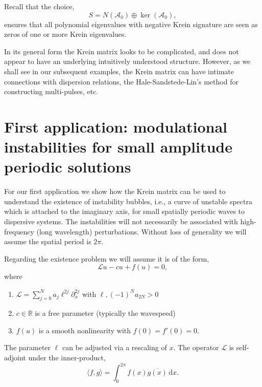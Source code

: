 \documentclass[review,onefignum,onetabnum]{siamart171218}
\newcommand{\R}{\mathbb{R}}
\def\ker{\mathop\mathrm{ker}\nolimits}
\newcommand{\rmd}{\mathrm{d}}
\newcommand{\calA}{\mathcal{A}}
\newcommand{\calL}{\mathcal{L}}
\begin{document}
\begin{remark}
Recall that the choice,
\[
S=N(\calA_0)\oplus\ker(\calA_0),
\]
ensures that all polynomial eigenvalues with negative Krein signature are seen as zeros of one or more Krein eigenvalues.
\end{remark}
%
%

In its general form the Krein matrix looks to be complicated, and does not appear to have an underlying intuitively understood structure.  However, as we shall see in our subsequent examples, the Krein matrix can have intimate connections with dispersion relations, the Hale-Sandstede-Lin's method for constructing multi-pulses, etc.

\section{First application: modulational instabilities for small amplitude periodic solutions}\label{s:4}

For our first application we show how the Krein matrix can be used to understand the existence of
instability bubbles, i.e., a curve of unstable spectra which is attached to the imaginary axis, for small spatially periodic waves to dispersive systems.
The instabilities will not necessarily be associated with high-frequency
(long wavelength) perturbations. Without loss of generality we will assume the spatial period is $2\pi$.

Regarding the existence problem we will assume it is of the form,
\begin{equation}\label{e:51}
\calL u-cu+f(u)=0,
\end{equation}
where
\begin{enumerate}
\item $\displaystyle{\calL=\sum_{j=0}^Na_j\ell^{2j}\partial_x^{2j}}$ with
    $\ell,(-1)^Na_{2N}>0$
\item $c\in\R$ is a free parameter (typically the wavespeed)
\item $f(u)$ is a smooth nonlinearity with $f(0)=f'(0)=0$.
\end{enumerate}
The parameter $\ell$ can be adjusted via a rescaling of $x$.
The operator $\calL$ is self-adjoint under the inner-product,
\[
\langle f,g\rangle=\int_0^{2\pi}f(x)\overline{g(x)}\,\rmd x.
\]
\end{document}

